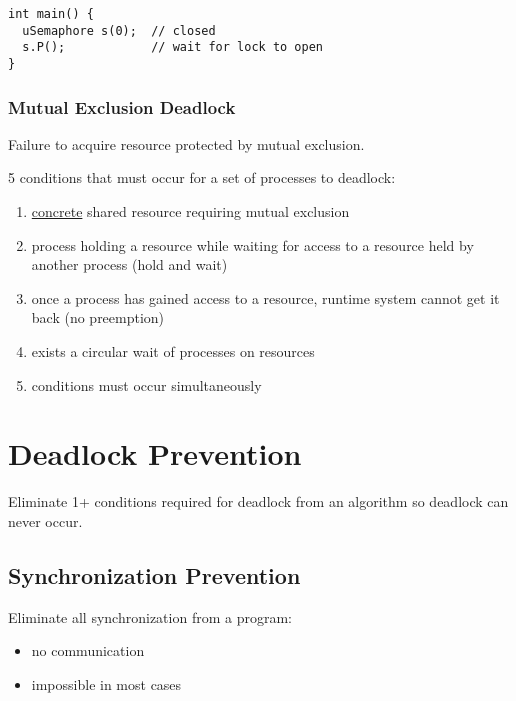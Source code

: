 \documentclass[11pt]{article}
\begin{document}
\begin{verbatim}
int main() {
  uSemaphore s(0);  // closed
  s.P();            // wait for lock to open
}
\end{verbatim}
\subsubsection{Mutual Exclusion Deadlock}
\label{sec:org5f187e9}
Failure to acquire resource protected by mutual exclusion.

5 conditions that must occur for a set of processes to deadlock:
\begin{enumerate}
\item \uline{concrete} shared resource requiring mutual exclusion
\item process holding a resource while waiting for access to a resource held by another process
(hold and wait)
\item once a process has gained access to a resource, runtime system cannot get it back (no
preemption)
\item exists a circular wait of processes on resources
\item conditions must occur simultaneously
\end{enumerate}
\section{Deadlock Prevention}
\label{sec:org23cc602}
Eliminate 1+ conditions required for deadlock from an algorithm so deadlock can never occur.
\subsection{Synchronization Prevention}
\label{sec:orgbbb4b85}
Eliminate all synchronization from a program:
\begin{itemize}
\item no communication
\item impossible in most cases
\end{itemize}
\end{document}
